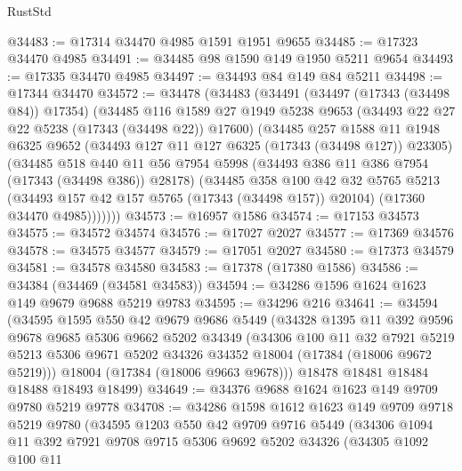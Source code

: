 \begin{lexlean}{RustStd}
\begin{coremodule}
@34483 := @17314 @34470 @4985 @1591 @1951 @9655
@34485 := @17323 @34470 @4985
@34491 := @34485 @98 @1590 @149 @1950 @5211 @9654
@34493 := @17335 @34470 @4985
@34497 := @34493 @84 @149 @84 @5211
@34498 := @17344 @34470
@34572 := @34478
    (@34483
      (@34491
        (@34497 (@17343 (@34498 @84)) @17354)
        (@34485
          @116
          @1589
          @27
          @1949
          @5238
          @9653
          (@34493 @22 @27 @22 @5238 (@17343 (@34498 @22)) @17600)
          (@34485
            @257
            @1588
            @11
            @1948
            @6325
            @9652
            (@34493 @127 @11 @127 @6325 (@17343 (@34498 @127)) @23305)
            (@34485
              @518
              @440
              @11
              @56
              @7954
              @5998
              (@34493 @386 @11 @386 @7954 (@17343 (@34498 @386)) @28178)
              (@34485
                @358
                @100
                @42
                @32
                @5765
                @5213
                (@34493 @157 @42 @157 @5765 (@17343 (@34498 @157)) @20104)
                (@17360 @34470 @4985)))))))
@34573 := @16957 @1586
@34574 := @17153 @34573
@34575 := @34572 @34574
@34576 := @17027 @2027
@34577 := @17369 @34576
@34578 := @34575 @34577
@34579 := @17051 @2027
@34580 := @17373 @34579
@34581 := @34578 @34580
@34583 := @17378 (@17380 @1586)
@34586 := @34384 (@34469 (@34581 @34583))
@34594 := @34286 @1596 @1624 @1623 @149 @9679 @9688 @5219 @9783
@34595 := @34296 @216
@34641 := @34594
    (@34595
      @1595
      @550
      @42
      @9679
      @9686
      @5449
      (@34328
        @1395
        @11
        @392
        @9596
        @9678
        @9685
        @5306
        @9662
        @5202
        @34349
        (@34306
          @100
          @11
          @32
          @7921
          @5219
          @5213
          @5306
          @9671
          @5202
          @34326
          @34352
          @18004
          (@17384 (@18006 @9672 @5219)))
        @18004
        (@17384 (@18006 @9663 @9678)))
      @18478
      @18481
      @18484
      @18488
      @18493
      @18499)
@34649 := @34376 @9688 @1624 @1623 @149 @9709 @9780 @5219 @9778
@34708 := @34286
    @1598
    @1612
    @1623
    @149
    @9709
    @9718
    @5219
    @9780
    (@34595
      @1203
      @550
      @42
      @9709
      @9716
      @5449
      (@34306
        @1094
        @11
        @392
        @7921
        @9708
        @9715
        @5306
        @9692
        @5202
        @34326
        (@34305
          @1092
          @100
          @11

\end{coremodule}
\end{lexlean}
